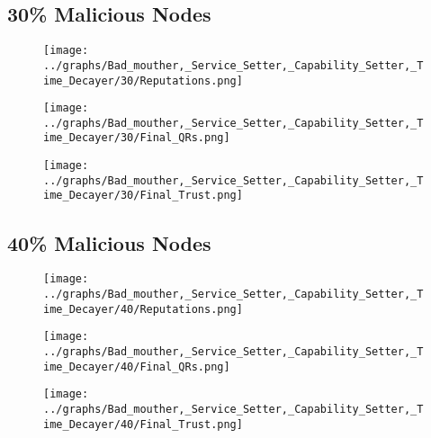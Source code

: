 \documentclass{article}
\begin{document}
  \begin{minipage}[t]{0.49\columnwidth}
    \subsection*{30\% Malicious Nodes}
        \begin{figure}[H]
            \centering
            \texttt{[image: ../graphs/Bad\_mouther,\_Service\_Setter,\_Capability\_Setter,\_Time\_Decayer/30/Reputations.png]}
        \end{figure}
        \begin{figure}[H]
            \centering
            \texttt{[image: ../graphs/Bad\_mouther,\_Service\_Setter,\_Capability\_Setter,\_Time\_Decayer/30/Final\_QRs.png]}
        \end{figure}
    \end{minipage}
    \begin{minipage}[t]{0.49\columnwidth}
        \begin{figure}[H]
            \centering
            \texttt{[image: ../graphs/Bad\_mouther,\_Service\_Setter,\_Capability\_Setter,\_Time\_Decayer/30/Final\_Trust.png]}
        \end{figure}
    \end{minipage}

  \begin{minipage}[t]{0.49\columnwidth}
    \subsection*{40\% Malicious Nodes}
        \begin{figure}[H]
            \centering
            \texttt{[image: ../graphs/Bad\_mouther,\_Service\_Setter,\_Capability\_Setter,\_Time\_Decayer/40/Reputations.png]}
        \end{figure}
        \begin{figure}[H]
            \centering
            \texttt{[image: ../graphs/Bad\_mouther,\_Service\_Setter,\_Capability\_Setter,\_Time\_Decayer/40/Final\_QRs.png]}
        \end{figure}
    \end{minipage}
    \begin{minipage}[t]{0.49\columnwidth}
        \begin{figure}[H]
            \centering
            \texttt{[image: ../graphs/Bad\_mouther,\_Service\_Setter,\_Capability\_Setter,\_Time\_Decayer/40/Final\_Trust.png]}
        \end{figure}
    \end{minipage}
\end{document}
